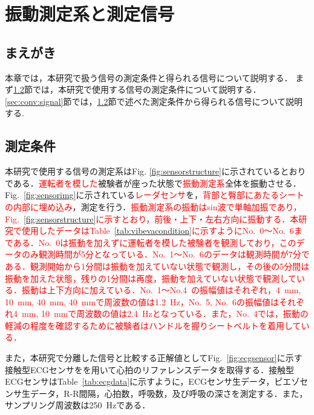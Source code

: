\chapter{振動測定系と測定信号}
\label{chap:measurementstructsig}

\section{まえがき}
本章では，本研究で扱う信号の測定条件と得られる信号について説明する．
まず\ref{sec:conv:measurementcondition}節では，本研究で使用する信号の測定条件について説明する．
\ref{sec:conv:signal}節では，\ref{sec:conv:measurementcondition}節で述べた測定条件から得られる信号について説明する.

\section{測定条件}
\label{sec:conv:measurementcondition}
本研究で使用する信号の測定系はFig. \ref{fig:sensorstructure}に示されているとおりである．\textcolor{red}{運転者を模した}被験者が座った状態で\textcolor{red}{振動測定系}全体を振動させる．Fig.~\ref{fig:sensorimg}に示されている\textcolor{red}{レーダセンサ}を，\textcolor{red}{背部と臀部にあたるシートの内部に埋め込み}，測定を行う．\textcolor{red}{振動測定系の振動はsin波で単軸加振であり，Fig.~\ref{fig:sensorstructure}に示すとおり，前後・上下・左右方向に振動する．本研究で使用したデータはTable~\ref{tab:vibevacondition}に示すようにNo.~0～No.~6まである．No.~0は振動を加えずに運転者を模した被験者を観測しており，このデータのみ観測時間が5分となっている．No.~1～No.~6のデータは観測時間が7分である．観測開始から1分間は振動を加えていない状態で観測し，その後の5分間は振動を加えた状態，残りの1分間は再度，振動を加えていない状態で観測している．振動は上下方向に加えている．No.~1～No.4~の振幅値はそれぞれ，4~mm, 10~mm, 40~mm, 40~mmで周波数の値は1.2~Hz，No.~5, No.~6の振幅値はそれぞれ4~mm, 10~mmで周波数の値は2.4~Hzとなっている．また，No.~4では，振動の軽減の程度を確認するために被験者はハンドルを握りシートベルトを着用している．}

また，本研究で分離した信号と比較する正解値としてFig.~\ref{fig:ecgsensor}に示す接触型ECGセンサをを用いて心拍のリファレンスデータを取得する．接触型ECGセンサはTable~\ref{tab:ecgdata}に示すように，ECGセンサ生データ，ピエゾセンサ生データ，R-R間隔，心拍数，呼吸数，及び呼吸の深さを測定する．また，サンプリング周波数は250~Hzである．


